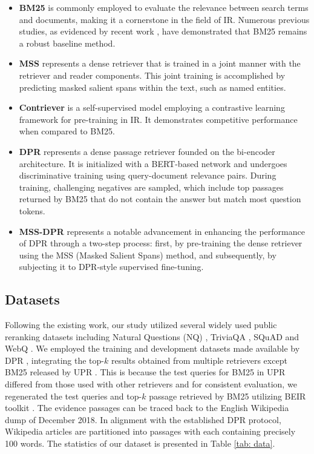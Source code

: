 \documentclass[sigconf,natbib=true,anonymous=false]{acmart}
\begin{document}
\begin{itemize}
\item \textbf{BM25} is commonly employed to evaluate the relevance between search terms and documents, making it a cornerstone in the field of IR. Numerous previous studies, as evidenced by recent work \cite{DBLP:journals/corr/abs-2104-05740}, have demonstrated that BM25 remains a robust baseline method. %
\item \textbf{MSS} represents a dense retriever that is trained in a joint manner with the retriever and reader components. This joint training is accomplished by predicting masked salient spans within the text, such as named entities. 
\item \textbf{Contriever} is a self-supervised model employing a contrastive learning framework for pre-training in IR. It demonstrates competitive performance when compared to BM25.
\item \textbf{DPR} represents a dense passage retriever founded on the bi-encoder architecture. It is initialized with a BERT-based network and undergoes discriminative training using query-document relevance pairs. During training, challenging negatives are sampled, which include top passages returned by BM25 that do not contain the answer but match most question tokens.
\item \textbf{MSS-DPR} represents a notable advancement in enhancing the performance of DPR through a two-step process: first, by pre-training the dense retriever using the MSS (Masked Salient Spans) method, and subsequently, by subjecting it to DPR-style supervised fine-tuning.
\end{itemize}

\subsection{Datasets}

Following the existing work, our study utilized several widely used public reranking datasets including Natural Questions (NQ) \cite{DBLP:journals/tacl/KwiatkowskiPRCP19}, TriviaQA \cite{DBLP:conf/acl/JoshiCWZ17}, SQuAD \cite{DBLP:conf/emnlp/RajpurkarZLL16} and WebQ \cite{DBLP:conf/emnlp/BerantCFL13}. We employed the training and development datasets made available by DPR \cite{DBLP:conf/emnlp/KarpukhinOMLWEC20}, integrating the top-$k$ results obtained from multiple retrievers except BM25 released by UPR \cite{DBLP:journals/tmlr/IzacardCHRBJG22}. This is because the test queries for BM25 in UPR \cite{DBLP:conf/acl/SachanPSKPHC20} differed from those used with other retrievers and for consistent evaluation, we regenerated the test queries and top-$k$ passage retrieved by BM25 utilizing BEIR toolkit \cite{DBLP:conf/nips/Thakur0RSG21}. The evidence passages can be traced back to the English Wikipedia dump of December 2018. In alignment with the established DPR protocol, Wikipedia articles are partitioned into passages with each containing precisely 100 words. The statistics of our dataset is presented in Table \ref{tab: data}.
\end{document}
